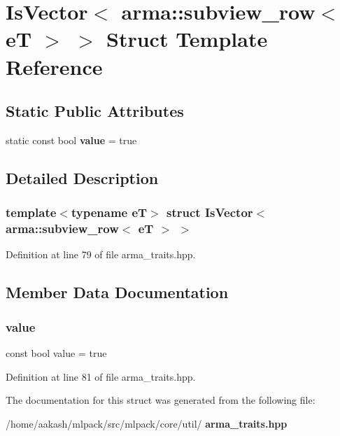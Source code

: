 \section{Is\+Vector$<$ arma\+:\+:subview\+\_\+row$<$ eT $>$ $>$ Struct Template Reference}
\label{structIsVector_3_01arma_1_1subview__row_3_01eT_01_4_01_4}
\subsection*{Static Public Attributes}
\begin{DoxyCompactItemize}
\item 
static const bool \textbf{ value} = true
\end{DoxyCompactItemize}


\subsection{Detailed Description}
\subsubsection*{template$<$typename eT$>$\newline
struct Is\+Vector$<$ arma\+::subview\+\_\+row$<$ e\+T $>$ $>$}



Definition at line 79 of file arma\+\_\+traits.\+hpp.



\subsection{Member Data Documentation}
\mbox{\label{structIsVector_3_01arma_1_1subview__row_3_01eT_01_4_01_4_a11ddd051208250c32dc4985abcafa86d}} 
\subsubsection{value}
{\footnotesize\ttfamily const bool value = true\hspace{0.3cm}{\ttfamily [static]}}



Definition at line 81 of file arma\+\_\+traits.\+hpp.



The documentation for this struct was generated from the following file\+:\begin{DoxyCompactItemize}
\item 
/home/aakash/mlpack/src/mlpack/core/util/\textbf{ arma\+\_\+traits.\+hpp}\end{DoxyCompactItemize}
